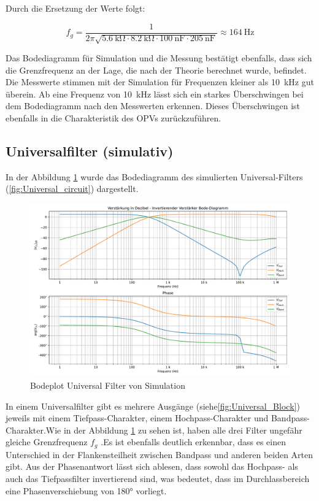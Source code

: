 Durch die Ersetzung der Werte folgt:

\begin{equation}
f_g = \frac{1}{2\pi \sqrt{\SI{5,6}{\kilo\ohm}\cdot \SI{8,2}{\kilo\ohm}\cdot \SI{100}{\nano\farad}\cdot \SI{205}{\nano\farad}}}\approx \SI{164}{\hertz}
\end{equation}

Das Bodediagramm für Simulation und die Messung bestätigt ebenfalls, dass sich die Grenzfrequenz an der Lage, die nach der Theorie berechnet wurde, befindet.\\

Die Messwerte stimmen mit der Simulation für Frequenzen kleiner als \SI{10}{\kilo\hertz} gut überein. Ab eine Frequenz von \SI{10}{\kilo\hertz} lässt sich ein starkes Überschwingen bei dem Bodediagramm nach den Messwerten erkennen. Dieses Überschwingen ist ebenfalls in die Charakteristik des OPVs zurückzuführen.

\subsection{Universalfilter (simulativ)}

In der Abbildung \ref{fig:Universalfilter_Bode} wurde das Bodediagramm des simulierten Universal-Filters (\ref{fig:Universal_circuit}) dargestellt.

\begin{figure}[H]
 \centering
 \includegraphics[width=0.7\linewidth]{Elektronik-Laborprotokoll_Filter/Plots/Universalfilter.pdf}
 \caption{ Bodeplot Universal Filter von Simulation }
 \label{fig:Universalfilter_Bode}
\end{figure}

In einem Universalfilter gibt es mehrere Ausgänge (siehe\ref{fig:Universal_Block}) jeweils mit einem Tiefpass-Charakter, einem Hochpass-Charakter und Bandpass-Charakter.Wie in der Abbildung \ref{fig:Universalfilter_Bode} zu sehen ist, haben alle drei Filter ungefähr gleiche Grenzfrequenz $f_g$ .Es ist ebenfalls deutlich erkennbar, dass es einen Unterschied in der Flankensteilheit zwischen Bandpass und anderen beiden Arten gibt. Aus der Phasenantwort lässt sich ablesen, dass sowohl das Hochpass- als auch das Tiefpassfilter invertierend sind, was bedeutet, dass im Durchlassbereich eine Phasenverschiebung von 180° vorliegt.

